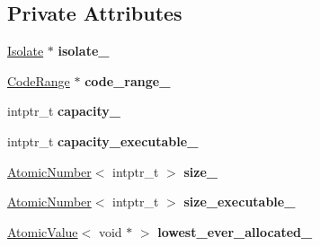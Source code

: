 \subsection*{Private Attributes}
\begin{DoxyCompactItemize}
\item 
\hyperlink{classv8_1_1internal_1_1_isolate}{Isolate} $\ast$ {\bfseries isolate\+\_\+}\hypertarget{classv8_1_1internal_1_1_memory_allocator_a420470b1c4ecfc450ff061d0c14a63b8}{}\label{classv8_1_1internal_1_1_memory_allocator_a420470b1c4ecfc450ff061d0c14a63b8}

\item 
\hyperlink{classv8_1_1internal_1_1_code_range}{Code\+Range} $\ast$ {\bfseries code\+\_\+range\+\_\+}\hypertarget{classv8_1_1internal_1_1_memory_allocator_aed6785a97c5718faac1d99d81583ef85}{}\label{classv8_1_1internal_1_1_memory_allocator_aed6785a97c5718faac1d99d81583ef85}

\item 
intptr\+\_\+t {\bfseries capacity\+\_\+}\hypertarget{classv8_1_1internal_1_1_memory_allocator_a5c3ebfee3fcfeaa1c1aaf7f3dd891215}{}\label{classv8_1_1internal_1_1_memory_allocator_a5c3ebfee3fcfeaa1c1aaf7f3dd891215}

\item 
intptr\+\_\+t {\bfseries capacity\+\_\+executable\+\_\+}\hypertarget{classv8_1_1internal_1_1_memory_allocator_a1d7f9e9d61eac6b49a36048310f55230}{}\label{classv8_1_1internal_1_1_memory_allocator_a1d7f9e9d61eac6b49a36048310f55230}

\item 
\hyperlink{classv8_1_1internal_1_1_atomic_number}{Atomic\+Number}$<$ intptr\+\_\+t $>$ {\bfseries size\+\_\+}\hypertarget{classv8_1_1internal_1_1_memory_allocator_a4e9e914582299bf3bb81a99975b83b39}{}\label{classv8_1_1internal_1_1_memory_allocator_a4e9e914582299bf3bb81a99975b83b39}

\item 
\hyperlink{classv8_1_1internal_1_1_atomic_number}{Atomic\+Number}$<$ intptr\+\_\+t $>$ {\bfseries size\+\_\+executable\+\_\+}\hypertarget{classv8_1_1internal_1_1_memory_allocator_a4907d6508143a84fa1d68cc6d067e6a0}{}\label{classv8_1_1internal_1_1_memory_allocator_a4907d6508143a84fa1d68cc6d067e6a0}

\item 
\hyperlink{classv8_1_1internal_1_1_atomic_value}{Atomic\+Value}$<$ void $\ast$ $>$ {\bfseries lowest\+\_\+ever\+\_\+allocated\+\_\+}\hypertarget{classv8_1_1internal_1_1_memory_allocator_a5e91d503636639b2e1e6c6b9887a6264}{}\label{classv8_1_1internal_1_1_memory_allocator_a5e91d503636639b2e1e6c6b9887a6264}


\end{DoxyCompactItemize}
